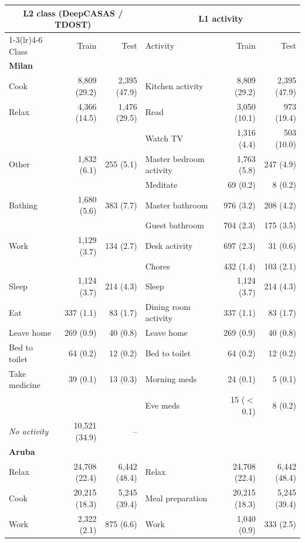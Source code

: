 \begin{tabular}{l rr l rr}
\toprule
\multicolumn{3}{c}{L2 class (DeepCASAS / TDOST)} & \multicolumn{3}{c}{L1 activity} \\
\cmidrule(lr){1-3}\cmidrule(lr){4-6}
Class & Train & Test & Activity & Train & Test \\
\midrule
\multicolumn{6}{l}{\textbf{Milan}} \\
Cook & 8{,}809 (29.2) & 2{,}395 (47.9) & Kitchen activity & 8{,}809 (29.2) & 2{,}395 (47.9) \\
Relax & 4{,}366 (14.5) & 1{,}476 (29.5) & Read & 3{,}050 (10.1) & 973 (19.4) \\
 &  &  & Watch TV & 1{,}316 (4.4) & 503 (10.0) \\
Other & 1{,}832 (6.1) & 255 (5.1) & Master bedroom activity & 1{,}763 (5.8) & 247 (4.9) \\
 &  &  & Meditate & 69 (0.2) & 8 (0.2) \\
Bathing & 1{,}680 (5.6) & 383 (7.7) & Master bathroom & 976 (3.2) & 208 (4.2) \\
 &  &  & Guest bathroom & 704 (2.3) & 175 (3.5) \\
Work & 1{,}129 (3.7) & 134 (2.7) & Desk activity & 697 (2.3) & 31 (0.6) \\
 &  &  & Chores & 432 (1.4) & 103 (2.1) \\
Sleep & 1{,}124 (3.7) & 214 (4.3) & Sleep & 1{,}124 (3.7) & 214 (4.3) \\
Eat & 337 (1.1) & 83 (1.7) & Dining room activity & 337 (1.1) & 83 (1.7) \\
Leave home & 269 (0.9) & 40 (0.8) & Leave home & 269 (0.9) & 40 (0.8) \\
Bed to toilet & 64 (0.2) & 12 (0.2) & Bed to toilet & 64 (0.2) & 12 (0.2) \\
Take medicine & 39 (0.1) & 13 (0.3) & Morning meds & 24 (0.1) & 5 (0.1) \\
 &  &  & Eve meds & 15 ($<$0.1) & 8 (0.2) \\
\textit{No activity} & 10{,}521 (34.9) & -- &  &  &  \\
\midrule
\multicolumn{6}{l}{\textbf{Aruba}} \\
Relax & 24{,}708 (22.4) & 6{,}442 (48.4) & Relax & 24{,}708 (22.4) & 6{,}442 (48.4) \\
Cook & 20{,}215 (18.3) & 5{,}245 (39.4) & Meal preparation & 20{,}215 (18.3) & 5{,}245 (39.4) \\
Work & 2{,}322 (2.1) & 875 (6.6) & Work & 1{,}040 (0.9) & 333 (2.5) \\

\end{tabular}
